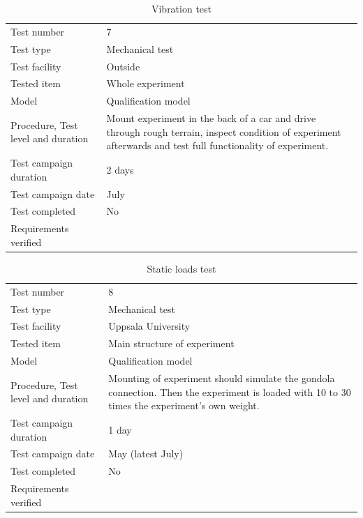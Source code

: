 \documentclass[12pt,a4paper]{report}
\begin{document}
\begin{table}[H]
\centering
\caption{Vibration test}
\label{tab:test_vibration}
\begin{tabular}{L{5cm}L{10cm}}
\toprule
Test number & 7 \\
Test type & Mechanical test \\
Test facility & Outside \\
Tested item & Whole experiment \\
Model & Qualification model \\
Procedure, Test level and duration & Mount experiment in the back of a car and drive through rough terrain, inspect condition of experiment afterwards and test full functionality of experiment. \\
Test campaign duration & 2 days \\
Test campaign date & July \\
Test completed & No \\
Requirements verified & \\
\bottomrule
\end{tabular}
\end{table}


\begin{table}[H]
\centering
\caption{Static loads test}
\label{tab:test_static_loads}
\begin{tabular}{L{5cm}L{10cm}}
\toprule
Test number & 8 \\
Test type & Mechanical test \\
Test facility & Uppsala University \\
Tested item & Main structure of experiment \\
Model & Qualification model \\
Procedure, Test level and duration & Mounting of experiment should simulate the gondola connection. Then the experiment is loaded with 10 to 30 times the experiment's own weight. \\
Test campaign duration & 1 day \\
Test campaign date & May (latest July) \\
Test completed & No \\
Requirements verified & \\
\bottomrule
\end{tabular}
\end{table}
\end{document}
